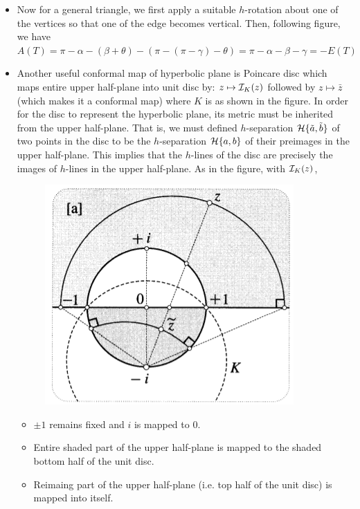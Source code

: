 \documentclass[12pt]{article}
\def\mc{\ensuremath\mathcal}
\def\td{\ensuremath\tilde}
\begin{document}
\begin{itemize}
    \item Now for a general triangle, we first apply a suitable $h$-rotation about one of the vertices so that one of the edge becomes vertical. Then, following figure, we have $A(T) = \pi-\alpha-(\beta+\theta)-(\pi-(\pi-\gamma)-\theta)=\pi-\alpha-\beta-\gamma = -E(T)$

    \item Another useful conformal map of hyperbolic plane is Poincare disc which maps entire upper half-plane into unit disc by: $z \mapsto \mc{I}_{K}(z)$ followed by $z\mapsto \bar{z}$ (which makes it a conformal map) where $K$ is as shown in the figure. In order for the disc to represent the hyperbolic plane, its metric must be inherited from the upper half-plane. That is, we must defined $h$-separation $\mc{H}\{\td{a},\td{b}\}$ of two points in the disc to be the $h$-separation $\mc{H}\{a,b\}$ of their preimages in the upper half-plane. This implies that the $h$-lines of the disc are precisely the images of $h$-lines in the upper half-plane. As in the figure, with $\mc{I}_{K}(z)$,

    \begin{figure}[h!]
        \centering
        \includegraphics[scale=0.7]{fig_27}
        \label{fig_27}
    \end{figure}

    \begin{itemize}
        \item $\pm 1$ remains fixed and $i$ is mapped to $0$.

        \item Entire shaded part of the upper half-plane is mapped to the shaded bottom half of the unit disc.

        \item Reimaing part of the upper half-plane (i.e. top half of the unit disc) is mapped into itself.


\end{itemize}
\end{itemize}
\end{document}
